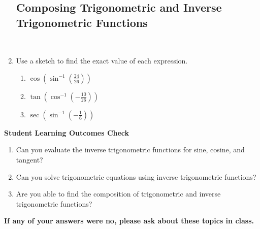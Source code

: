 \begin{enumerate}
\subsection{Composing Trigonometric and Inverse Trigonometric  Functions} ~

\item Use a sketch to find the exact value of each expression.
\begin{enumerate}
\item $\displaystyle \cos(\sin^{-1}(\frac{24}{26}))$\vfill
\vfill
\newpage
\item $\displaystyle \tan(\cos^{-1}(-\frac{10}{26}))$\vfill
\item $\displaystyle \sec(\sin^{-1}(-\frac{1}{6}))$\vfill
\end{enumerate}


\end{enumerate}
\vfill
\noindent \textbf{Student Learning Outcomes Check}

\begin{enumerate}
\item Can you evaluate the inverse trigonometric functions for sine, cosine, and tangent?
\item Can you solve trigonometric equations using inverse trigonometric functions?
\item Are you able to find the composition of trigonometric and inverse trigonometric functions?

\end{enumerate}

\noindent \textbf{If any of your answers were no, please ask about these topics in class.}

